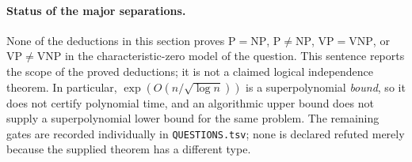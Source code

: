 \paragraph{Status of the major separations.}
None of the deductions in this section proves \(\mathrm P=\mathrm{NP}\),
\(\mathrm P\ne\mathrm{NP}\), \(\mathrm{VP}=\mathrm{VNP}\), or
\(\mathrm{VP}\ne\mathrm{VNP}\) in the characteristic-zero model of
the question.  This sentence reports the scope of the proved deductions;
it is not a claimed logical independence theorem.  In particular,
\(\exp(O(n/\sqrt{\log n}))\) is a superpolynomial \emph{bound},
so it does not certify polynomial time, and an algorithmic upper
bound does not supply a superpolynomial lower bound for the same
problem.  The remaining gates are recorded individually in
\texttt{QUESTIONS.tsv}; none is declared refuted merely because the
supplied theorem has a different type.
